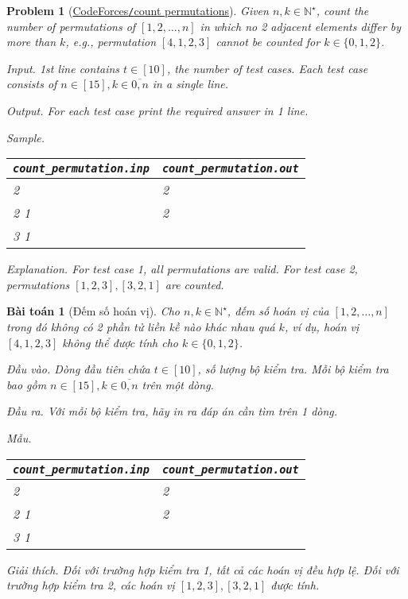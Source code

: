 \documentclass{article}
\newtheorem{baitoan}{Bài toán}
\newtheorem{problem}{Problem}
\begin{document}
\begin{problem}[\href{https://codeforces.com/gym/100589/problem/G}{CodeForces{\tt/}count permutations}]
    Given $n,k\in\mathbb{N}^\star$, count the number of permutations of $[1,2,\ldots,n]$ in which no 2 adjacent elements differ by more than $k$, e.g., permutation $[4,1,2,3]$ cannot be counted for $k\in\{0,1,2\}$.
    \item {\sf Input.} 1st line contains $t\in[10]$, the number of test cases. Each test case consists of $n\in[15],k\in\overline{0,n}$ in a single line.
    \item {\sf Output.} For each test case print the required answer in 1 line.
    \item {\sf Sample.}
    \begin{table}[H]
        \centering
        \begin{tabular}{|l|l|}
            \hline
            \verb|count_permutation.inp| & \verb|count_permutation.out| \\
            \hline
            2 & 2 \\
            2 1 & 2 \\
            3 1 & \\
            \hline
        \end{tabular}
    \end{table}
    \item {\sf Explanation.} For test case 1, all permutations are valid. For test case 2, permutations $[1,2,3],[3,2,1]$ are counted.
\end{problem}

\begin{baitoan}[Đếm số hoán vị]
    Cho $n,k\in\mathbb{N}^\star$, đếm số hoán vị của $[1,2,\ldots,n]$ trong đó không có 2 phần tử liền kề nào khác nhau quá $k$, ví dụ, hoán vị $[4,1,2,3]$ không thể được tính cho $k\in\{0,1,2\}$.
    \item {\sf Đầu vào.} Dòng đầu tiên chứa $t\in[10]$, số lượng bộ kiểm tra. Mỗi bộ kiểm tra bao gồm $n\in[15],k\in\overline{0,n}$ trên một dòng.
    \item {\sf Đầu ra.} Với mỗi bộ kiểm tra, hãy in ra đáp án cần tìm trên 1 dòng.
    \item {\sf Mẫu.}
    \begin{table}[H]
        \centering
        \begin{tabular}{|l|l|}
            \hline
            \verb|count_permutation.inp| & \verb|count_permutation.out| \\
            \hline
            2 & 2 \\
            2 1 & 2 \\
            3 1 & \\
            \hline
        \end{tabular}
    \end{table}
    \item {\sf Giải thích.} Đối với trường hợp kiểm tra 1, tất cả các hoán vị đều hợp lệ. Đối với trường hợp kiểm tra 2, các hoán vị $[1,2,3],[3,2,1]$ được tính.
\end{baitoan}
\end{document}
